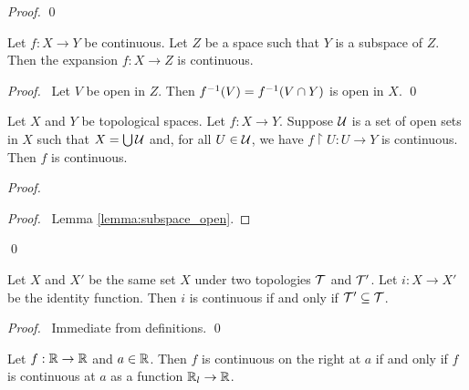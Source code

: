 \begin{proof}
    \pf
    \qed
\end{proof}

\begin{theorem}
    Let $f : X \rightarrow Y$ be continuous. Let $Z$ be a space such that $Y$ is a subspace of $Z$.
    Then the expansion $f : X \rightarrow Z$ is continuous.
\end{theorem}

\begin{proof}
    \pf\ Let $V$ be open in $Z$. Then ${f}^{-1}(V) = {f}^{-1}(V \cap Y)$ is open in $X$. \qed
\end{proof}

\begin{theorem}
    Let $X$ and $Y$ be topological spaces. Let $f : X \rightarrow Y$. Suppose $\mathcal{U}$ is a set of open sets
    in $X$ such that $X = \bigcup \mathcal{U}$ and, for all $U \in \mathcal{U}$, we have $f \restriction U : U \rightarrow Y$
    is continuous. Then $f$ is continuous.
\end{theorem}

\begin{proof}
    \pf
    \begin{proof}
        \pf\ Lemma \ref{lemma:subspace_open}.
    \end{proof}
    \qed
\end{proof}

\begin{proposition}
    Let $X$ and $X'$ be the same set $X$ under two topologies $\mathcal{T}$ and $\mathcal{T}'$. Let $i : X \rightarrow X'$
    be the identity function. Then $i$ is continuous if and only if $\mathcal{T}' \subseteq \mathcal{T}$.
\end{proposition}

\begin{proof}
    \pf\ Immediate from definitions. \qed
\end{proof}

\begin{proposition}
    Let $f : \mathbb{R} \rightarrow \mathbb{R}$ and $a \in \mathbb{R}$. Then $f$ is continuous on the right at $a$ if and only if
    $f$ is continuous at $a$ as a function $\mathbb{R}_l \rightarrow \mathbb{R}$.
\end{proposition}

